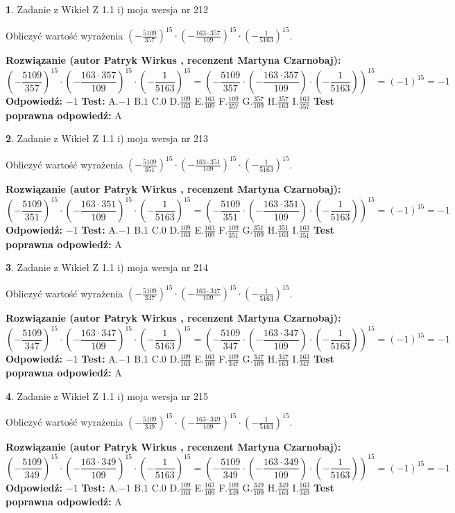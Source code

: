 \documentclass[12pt, a4paper]{article}
\theoremstyle{definition} %
\newtheorem{zad}{}
\newcommand{\zadStart}[1]{\begin{zad}#1\newline}
\newcommand{\zadStop}{\end{zad}}
\newcommand{\rozwStart}[2]{\noindent \textbf{Rozwiązanie (autor #1 , recenzent #2): }\newline}
\newcommand{\rozwStop}{\newline}
\newcommand{\odpStart}{\noindent \textbf{Odpowiedź:}\newline}
\newcommand{\odpStop}{\newline}
\newcommand{\testStart}{\noindent \textbf{Test:}\newline}
\newcommand{\testStop}{\newline}
\newcommand{\kluczStart}{\noindent \textbf{Test poprawna odpowiedź:}\newline}
\newcommand{\kluczStop}{\newline}
\begin{document}
\zadStart{Zadanie z Wikieł Z 1.1 i) moja wersja nr 212}

Obliczyć wartość wyrażenia $(-\frac{5109}{357})^{15} \cdot (-\frac{163 \cdot 357}{109})^{15} \cdot (-\frac{1}{5163})^{15}$.
\zadStop
\rozwStart{Patryk Wirkus}{Martyna Czarnobaj}
$$(-\frac{5109}{357})^{15} \cdot (-\frac{163 \cdot 357}{109})^{15} \cdot (-\frac{1}{5163})^{15} = (-\frac{5109}{357} \cdot (-\frac{163 \cdot 357}{109}) \cdot (-\frac{1}{5163}))^{15} = (-1)^{15} = -1$$
\rozwStop
\odpStart
$-1$
\odpStop
\testStart
A.$-1$ B.$1$ C.$0$ D.$\frac{109}{163}$ E.$\frac{163}{109}$
F.$\frac{109}{357}$ G.$\frac{357}{109}$
H.$\frac{357}{163}$
I.$\frac{163}{357}$
\testStop
\kluczStart
A
\kluczStop



\zadStart{Zadanie z Wikieł Z 1.1 i) moja wersja nr 213}

Obliczyć wartość wyrażenia $(-\frac{5109}{351})^{15} \cdot (-\frac{163 \cdot 351}{109})^{15} \cdot (-\frac{1}{5163})^{15}$.
\zadStop
\rozwStart{Patryk Wirkus}{Martyna Czarnobaj}
$$(-\frac{5109}{351})^{15} \cdot (-\frac{163 \cdot 351}{109})^{15} \cdot (-\frac{1}{5163})^{15} = (-\frac{5109}{351} \cdot (-\frac{163 \cdot 351}{109}) \cdot (-\frac{1}{5163}))^{15} = (-1)^{15} = -1$$
\rozwStop
\odpStart
$-1$
\odpStop
\testStart
A.$-1$ B.$1$ C.$0$ D.$\frac{109}{163}$ E.$\frac{163}{109}$
F.$\frac{109}{351}$ G.$\frac{351}{109}$
H.$\frac{351}{163}$
I.$\frac{163}{351}$
\testStop
\kluczStart
A
\kluczStop



\zadStart{Zadanie z Wikieł Z 1.1 i) moja wersja nr 214}

Obliczyć wartość wyrażenia $(-\frac{5109}{347})^{15} \cdot (-\frac{163 \cdot 347}{109})^{15} \cdot (-\frac{1}{5163})^{15}$.
\zadStop
\rozwStart{Patryk Wirkus}{Martyna Czarnobaj}
$$(-\frac{5109}{347})^{15} \cdot (-\frac{163 \cdot 347}{109})^{15} \cdot (-\frac{1}{5163})^{15} = (-\frac{5109}{347} \cdot (-\frac{163 \cdot 347}{109}) \cdot (-\frac{1}{5163}))^{15} = (-1)^{15} = -1$$
\rozwStop
\odpStart
$-1$
\odpStop
\testStart
A.$-1$ B.$1$ C.$0$ D.$\frac{109}{163}$ E.$\frac{163}{109}$
F.$\frac{109}{347}$ G.$\frac{347}{109}$
H.$\frac{347}{163}$
I.$\frac{163}{347}$
\testStop
\kluczStart
A
\kluczStop



\zadStart{Zadanie z Wikieł Z 1.1 i) moja wersja nr 215}

Obliczyć wartość wyrażenia $(-\frac{5109}{349})^{15} \cdot (-\frac{163 \cdot 349}{109})^{15} \cdot (-\frac{1}{5163})^{15}$.
\zadStop
\rozwStart{Patryk Wirkus}{Martyna Czarnobaj}
$$(-\frac{5109}{349})^{15} \cdot (-\frac{163 \cdot 349}{109})^{15} \cdot (-\frac{1}{5163})^{15} = (-\frac{5109}{349} \cdot (-\frac{163 \cdot 349}{109}) \cdot (-\frac{1}{5163}))^{15} = (-1)^{15} = -1$$
\rozwStop
\odpStart
$-1$
\odpStop
\testStart
A.$-1$ B.$1$ C.$0$ D.$\frac{109}{163}$ E.$\frac{163}{109}$
F.$\frac{109}{349}$ G.$\frac{349}{109}$
H.$\frac{349}{163}$
I.$\frac{163}{349}$
\testStop
\kluczStart
A
\kluczStop
\end{document}

